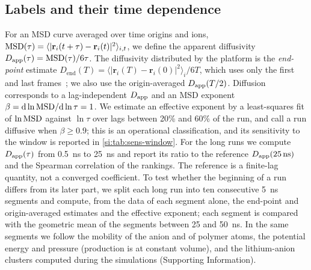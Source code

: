 \documentclass[journal=jcisd8,manuscript=article,email=true]{achemso}
\begin{document}
\subsection{Labels and their time dependence}\label{sec:labels}
For an MSD curve averaged over time origins and ions,
$\mathrm{MSD}(\tau)=\langle|\mathbf r_i(t+\tau)-\mathbf r_i(t)|^2\rangle_{i,t}$, we define the apparent
diffusivity $D_{\mathrm{app}}(\tau)=\mathrm{MSD}(\tau)/6\tau$. The diffusivity distributed by the platform is the
\emph{end-point} estimate $D_{\mathrm{end}}(T)=\langle|\mathbf r_i(T)-\mathbf r_i(0)|^2\rangle_i/6T$,
which uses only the first and last frames~\cite{HTPMDcode}; we also use the origin-averaged
$D_{\mathrm{app}}(T/2)$. Diffusion corresponds to a lag-independent $D_{\mathrm{app}}$ and an MSD exponent
$\beta=\mathrm d\ln\mathrm{MSD}/\mathrm d\ln\tau=1$. We estimate an effective exponent by a least-squares
fit of $\ln\mathrm{MSD}$ against $\ln\tau$ over lags between 20\% and 60\% of the run, and call a run
diffusive when $\beta\ge0.9$; this is an operational classification, and its sensitivity to the
window is reported in \cref{si:tab:sens-window}. For the long runs we compute $D_{\mathrm{app}}(\tau)$ from
\SI{0.5}{\nano\second} to \SI{25}{\nano\second} and report its ratio to the reference
$D_{\mathrm{app}}(\SI{25}{\nano\second})$ and the Spearman correlation of the rankings. The reference is a
finite-lag quantity, not a converged coefficient. To test whether the beginning of a run differs
from its later part, we split each long run into ten consecutive \SI{5}{\nano\second} segments
and compute, from the data of each segment alone, the end-point and origin-averaged estimates and
the effective exponent; each segment is compared with the geometric mean of the segments between
25 and \SI{50}{\nano\second}. In the same segments we follow the mobility of the anion and of
polymer atoms, the potential energy and pressure (production is at constant volume), and the
lithium-anion clusters computed during the simulations (Supporting Information).
\end{document}
